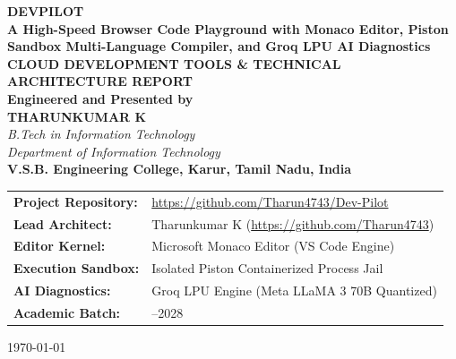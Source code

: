 \documentclass[12pt,a4paper]{report}
\begin{document}
\begin{titlepage}
    \centering
    \vspace*{0.8cm}
    
    {\Huge \textbf{DEVPILOT}}\\[0.3cm]
    {\LARGE \textbf{A High-Speed Browser Code Playground with Monaco Editor, Piston Sandbox Multi-Language Compiler, and Groq LPU AI Diagnostics}}\\[1.2cm]
    
    {\large \textbf{CLOUD DEVELOPMENT TOOLS \& TECHNICAL ARCHITECTURE REPORT}}\\[1.0cm]
    
    \textbf{Engineered and Presented by}\\[0.3cm]
    {\Large \textbf{THARUNKUMAR K}}\\[0.2cm]
    \textit{B.Tech in Information Technology}\\[0.1cm]
    \textit{Department of Information Technology}\\[0.2cm]
    \textbf{V.S.B. Engineering College, Karur, Tamil Nadu, India}\\[1.5cm]
    
    \vfill
    
    \begin{tabular}{>{\raggedright\arraybackslash\bfseries}p{4.2cm}>{\raggedright\arraybackslash}p{10.2cm}}
        Project Repository: & \url{https://github.com/Tharun4743/Dev-Pilot} \\
        Lead Architect: & Tharunkumar K (\url{https://github.com/Tharun4743}) \\
        Editor Kernel: & Microsoft Monaco Editor (VS Code Engine) \\
        Execution Sandbox: & Isolated Piston Containerized Process Jail \\
        AI Diagnostics: & Groq LPU Engine (Meta LLaMA 3 70B Quantized) \\
        Academic Batch: & 2024--2028 \\
    \end{tabular}
    
    \vspace*{0.8cm}
    {\small \today}
\end{titlepage}

\cleardoublepage
{}
\setcounter{page}{1}
\end{document}
